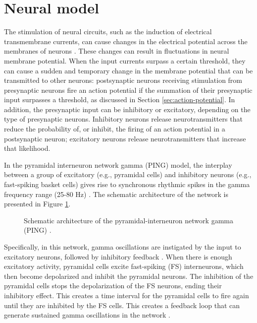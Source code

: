 \section{Neural model}
\label{sec:grid-ping}

The stimulation of neural circuits, such as the induction of electrical transmembrane currents, can cause changes in the electrical potential across the membranes of neurons \cite{IzhikevichBook2004:2}. These changes can result in fluctuations in neural membrane potential. 
When the input currents surpass a certain threshold, they can cause a sudden and temporary change in the membrane potential that can be transmitted to other neurons: postsynaptic neurons receiving stimulation from presynaptic neurons fire an action potential if the summation of their presynaptic input surpasses a threshold, as discussed in Section \ref{sec:action-potential}. In addition, the presynaptic input can be inhibitory or excitatory, depending on the type of presynaptic neurons. Inhibitory neurons release neurotransmitters that reduce the probability of, or inhibit, the firing of an action potential in a postsynaptic neuron; excitatory neurons release neurotransmitters that increase that likelihood. 

In the pyramidal interneuron network gamma (PING) model, the interplay between a group of  excitatory (e.g., pyramidal cells) and inhibitory neurons (e.g., fast-spiking basket cells) gives rise to synchronous rhythmic spikes in the gamma frequency range (25-80 Hz)  \cite{Whittington2000, Borgers2003}. The schematic architecture of the network is presented in Figure \ref{fig:single-ping}.

\begin{figure}[!htp]
    \centering
    
    \caption[Schematic architecture of PING]{Schematic architecture of the pyramidal-interneuron network gamma (PING) \cite{Lowet2015}.}
    \label{fig:single-ping}
\end{figure}

Specifically, in this network, gamma oscillations are instigated by the input to excitatory neurons, followed by inhibitory feedback \cite{Whittington2000}. When there is enough excitatory activity, pyramidal cells excite fast-spiking (FS) interneurons, which then become depolarized and inhibit the pyramidal neurons. The inhibition of the pyramidal cells stops the depolarization of the FS neurons, ending their inhibitory effect.
This creates a time interval for the pyramidal cells to fire again until they are inhibited by the FS cells. This creates a feedback loop that can generate sustained gamma oscillations in the network \cite{Kopell2011}.

